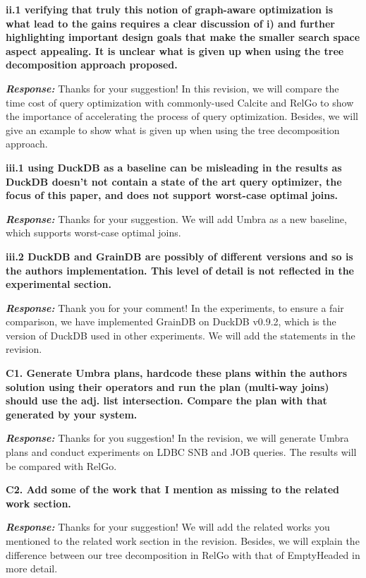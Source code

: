 \textbf{
ii.1 verifying that truly this notion of graph-aware optimization is what lead to the gains requires a clear discussion of i) and further highlighting important design goals that make the smaller search space aspect appealing.
It is unclear what is given up when using the tree decomposition approach proposed.}

\textbf{\textit{Response: }}
Thanks for your suggestion! In this revision, we will compare the time cost of query optimization with commonly-used Calcite and RelGo to show the importance of accelerating the process of query optimization.
Besides, we will give an example to show what is given up when using the tree decomposition approach. 


\textbf{
iii.1 using DuckDB as a baseline can be misleading in the results
as DuckDB doesn't not contain a state of the art query optimizer, the focus of this paper, and does not support worst-case optimal joins.}

\textbf{\textit{Response: }}
Thanks for your suggestion. We will add Umbra as a new baseline, which supports worst-case optimal joins.

\textbf{
iii.2 DuckDB and GrainDB are possibly of different versions and so is the authors implementation. This level of detail is not reflected in the experimental section.}

\textbf{\textit{Response: }}
Thank you for your comment! In the experiments, to ensure a fair comparison, we have implemented GrainDB on DuckDB v0.9.2, which is the version of DuckDB used in other experiments. We will add the statements in the revision.


\textbf{
C1. Generate Umbra plans, hardcode these plans within the authors solution using their operators and run the plan (multi-way joins) should use the adj. list intersection. Compare the plan with that generated by your system. }

\textbf{\textit{Response: }}
Thanks for you suggestion! In the revision, we will generate Umbra plans and conduct experiments on LDBC SNB and JOB queries. The results will be compared with RelGo.

\textbf{
C2. Add some of the work that I mention as missing to the related work section.}

\textbf{\textit{Response: }} Thanks for your suggestion! We will add the related works you mentioned to the related work section in the revision. Besides, we will explain the difference between our tree decomposition in RelGo with that of EmptyHeaded in more detail.


